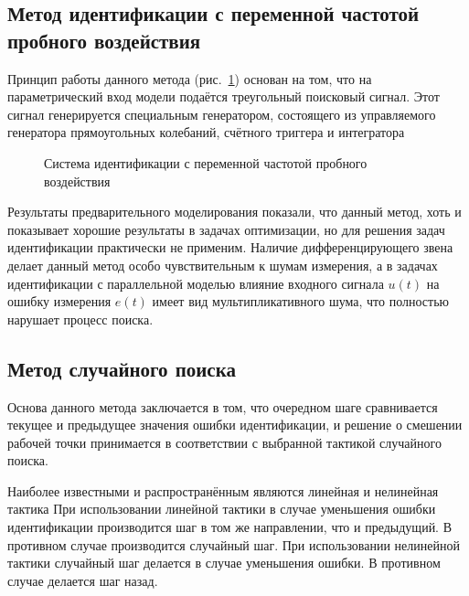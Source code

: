 
\subsection{Метод идентификации с переменной частотой пробного воздействия} %

Принцип работы данного метода
(рис.~\ref{atu:f:varfreq})
основан на том, что на параметрический вход модели подаётся треугольный поисковый сигнал.
Этот сигнал генерируется специальным генератором,
состоящего из управляемого генератора прямоугольных колебаний,
счётного триггера и интегратора%


\begin{figure}[htb!]
\begin{center}

\end{center}
\caption{Система идентификации с переменной частотой пробного воздействия}
\label{atu:f:varfreq}
\end{figure}


Результаты предварительного моделирования показали,
что данный метод, хоть и показывает хорошие результаты
в задачах оптимизации, но для решения задач идентификации 
практически не применим. Наличие дифференцирующего 
звена делает данный метод особо чувствительным к шумам
измерения, а в задачах идентификации с параллельной моделью
влияние входного сигнала \( u(t) \)
на ошибку измерения \( e(t) \) 
имеет вид мультипликативного шума,
что полностью нарушает процесс поиска.


\subsection{Метод случайного поиска} %

Основа данного метода заключается в том, что
очередном шаге сравнивается текущее и предыдущее
значения ошибки идентификации, и решение о смешении
рабочей точки принимается в соответствии с выбранной
тактикой случайного поиска.

Наиболее известными и распространённым
являются линейная и нелинейная тактика
При использовании линейной тактики
в случае уменьшения ошибки идентификации
производится шаг в том же направлении, что и предыдущий.
В противном случае производится случайный шаг.
При использовании нелинейной тактики
случайный шаг делается в случае уменьшения ошибки.
В противном случае делается шаг назад.

